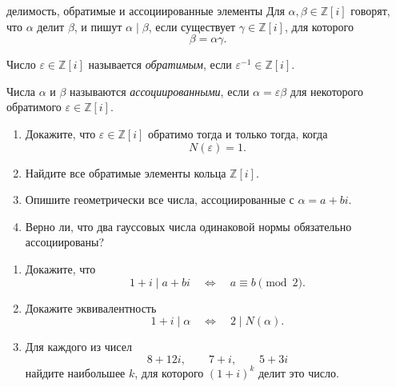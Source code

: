 \medskip

\begin{defbox}{делимость, обратимые и ассоциированные элементы}
Для $\alpha,\beta\in\mathbb Z[i]$ говорят, что $\alpha$ делит $\beta$,
и пишут $\alpha\mid\beta$, если существует $\gamma\in\mathbb Z[i]$,
для которого
\[
    \beta=\alpha\gamma.
\]

Число $\varepsilon\in\mathbb Z[i]$ называется \emph{обратимым}, если
$\varepsilon^{-1}\in\mathbb Z[i]$.

Числа $\alpha$ и $\beta$ называются \emph{ассоциированными}, если
$\alpha=\varepsilon\beta$ для некоторого обратимого
$\varepsilon\in\mathbb Z[i]$.
\end{defbox}


\begin{enumerate}[label=\textbf{\alph*)}, leftmargin=8mm]
    \item Докажите, что $\varepsilon\in\mathbb Z[i]$ обратимо тогда
    и только тогда, когда
    \[
        N(\varepsilon)=1.
    \]

    \item Найдите все обратимые элементы кольца $\mathbb Z[i]$.

    \item Опишите геометрически все числа, ассоциированные с
    $\alpha=a+bi$.

    \item Верно ли, что два гауссовых числа одинаковой нормы обязательно
    ассоциированы?
\end{enumerate}

\medskip


\begin{enumerate}[label=\textbf{\alph*)}, leftmargin=8mm]
    \item Докажите, что
    \[
        1+i\mid a+bi
        \quad\Longleftrightarrow\quad
        a\equiv b\pmod 2.
    \]

    \item Докажите эквивалентность
    \[
        1+i\mid\alpha
        \quad\Longleftrightarrow\quad
        2\mid N(\alpha).
    \]

    \item Для каждого из чисел
    \[
        8+12i,\qquad 7+i,\qquad 5+3i
    \]
    найдите наибольшее $k$, для которого $(1+i)^k$ делит это число.
\end{enumerate}

